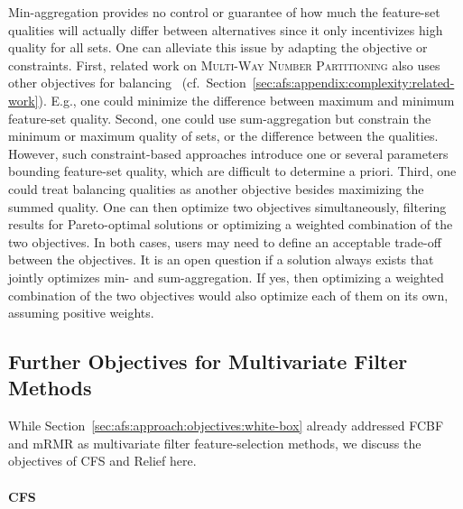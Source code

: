 \documentclass{article}
\theoremstyle{definition}
\begin{document}
Min-aggregation provides no control or guarantee of how much the feature-set qualities will actually differ between alternatives since it only incentivizes high quality for all sets.
One can alleviate this issue by adapting the objective or constraints.
First, related work on \textsc{Multi-Way Number Partitioning} also uses other objectives for balancing~\cite{korf2010objective, lawrinenko2017identical} (cf.~Section~\ref{sec:afs:appendix:complexity:related-work}).
E.g., one could minimize the difference between maximum and minimum feature-set quality.
Second, one could use sum-aggregation but constrain the minimum or maximum quality of sets, or the difference between the qualities.
However, such constraint-based approaches introduce one or several parameters bounding feature-set quality, which are difficult to determine a priori.
Third, one could treat balancing qualities as another objective besides maximizing the summed quality.
One can then optimize two objectives simultaneously, filtering results for Pareto-optimal solutions or optimizing a weighted combination of the two objectives.
In both cases, users may need to define an acceptable trade-off between the objectives.
It is an open question if a solution always exists that jointly optimizes min- and sum-aggregation.
If yes, then optimizing a weighted combination of the two objectives would also optimize each of them on its own, assuming positive weights.

\subsection{Further Objectives for Multivariate Filter Methods}
\label{sec:afs:appendix:multivariate-filter-objectives}

While Section~\ref{sec:afs:approach:objectives:white-box} already addressed FCBF and mRMR as multivariate filter feature-selection methods, we discuss the objectives of CFS and Relief here.

\paragraph{CFS}
\end{document}

